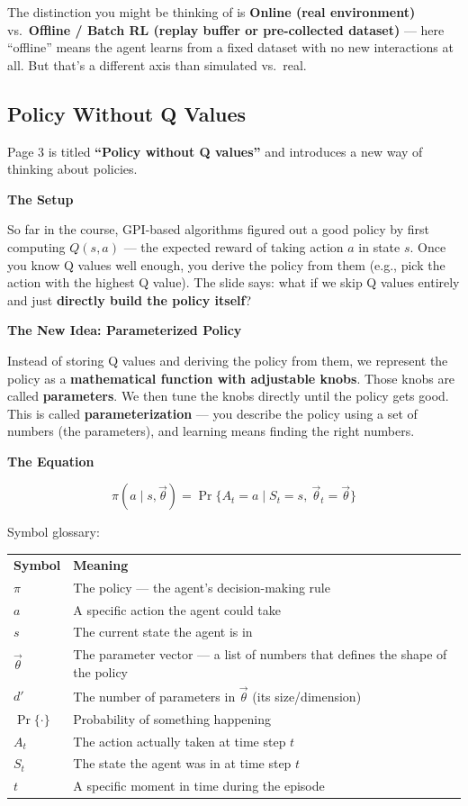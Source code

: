 The distinction you might be thinking of is \textbf{Online (real environment)} vs.\ \textbf{Offline / Batch RL (replay buffer or pre-collected dataset)} --- here ``offline'' means the agent learns from a fixed dataset with no new interactions at all. But that's a different axis than simulated vs.\ real.


\subsection{Policy Without Q Values}

Page 3 is titled \textbf{``Policy without Q values''} and introduces a new way of thinking about policies.

\textbf{The Setup}

So far in the course, GPI-based algorithms figured out a good policy by first computing $Q(s, a)$ --- the expected reward of taking action $a$ in state $s$. Once you know Q values well enough, you derive the policy from them (e.g., pick the action with the highest Q value). The slide says: what if we skip Q values entirely and just \textbf{directly build the policy itself}?

\textbf{The New Idea: Parameterized Policy}

Instead of storing Q values and deriving the policy from them, we represent the policy as a \textbf{mathematical function with adjustable knobs}. Those knobs are called \textbf{parameters}. We then tune the knobs directly until the policy gets good. This is called \textbf{parameterization} --- you describe the policy using a set of numbers (the parameters), and learning means finding the right numbers.

\textbf{The Equation}

\[
\pi(a \mid s, \vec{\theta}) = \Pr\{A_t = a \mid S_t = s,\ \vec{\theta}_t = \vec{\theta}\}
\]

Symbol glossary:

\begin{tabular}{ll}
\textbf{Symbol} & \textbf{Meaning} \\[4pt]
$\pi$ & The policy --- the agent's decision-making rule \\
$a$ & A specific action the agent could take \\
$s$ & The current state the agent is in \\
$\vec{\theta}$ & The parameter vector --- a list of numbers that defines the shape of the policy \\
$d'$ & The number of parameters in $\vec{\theta}$ (its size/dimension) \\
$\Pr\{\cdot\}$ & Probability of something happening \\
$A_t$ & The action actually taken at time step $t$ \\
$S_t$ & The state the agent was in at time step $t$ \\
$t$ & A specific moment in time during the episode \\
\end{tabular}

